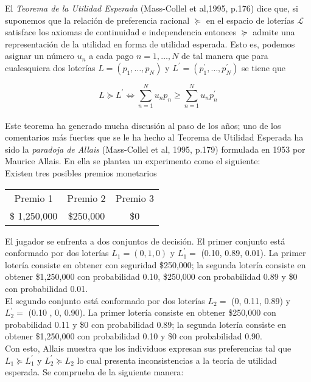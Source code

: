 El \textit{Teorema de la Utilidad Esperada} (Mass-Collel et al,1995, p.176) dice que, si suponemos que la relación de preferencia racional $\succeq$ en el espacio de loterías $\mathscr{L}$ satisface los axiomas de continuidad e independencia entonces $\succeq$ admite una representación de la utilidad en forma de utilidad esperada. Esto es, podemos asignar un número $u_n$ a cada pago $n = 1, \dots, N$ de tal manera que para cualesquiera dos loterías $L = (p_1,\dots,p_N)$ y $L^\prime = (p^{\prime}_1,\dots, p^{\prime}_N)$ se tiene que

$$
L \succeq L^\prime \Leftrightarrow \sum ^{N}_{n = 1} u_n p_n \geq \sum ^{N}_{n = 1} u_n p^{\prime}_n
$$ \\

Este teorema ha generado mucha discusión al paso de los años; uno de los comentarios más fuertes que se le ha hecho al Teorema de Utilidad Esperada ha sido la \textit{paradoja de Allais} (Mass-Collel et al, 1995, p.179) formulada en 1953 por Maurice Allais. En ella se plantea un experimento como el siguiente: \\

Existen tres posibles premios monetarios

\begin{table}[H]
\centering
\begin{tabular}{ccc}
Premio 1     & Premio 2  & Premio 3 \\
\$ 1,250,000 & \$250,000 & \$0     
\end{tabular}
\end{table}

El jugador se enfrenta a dos conjuntos de decisión. El primer conjunto está conformado por dos loterías $L_1 = (0,1,0)$ y $L^{\prime}_1 =$ (0.10, 0.89, 0.01). La primer lotería consiste en obtener con seguridad \$250,000; la segunda lotería consiste en obtener \$1,250,000 con probabilidad 0.10, \$250,000 con probabilidad 0.89 y \$0 con probabilidad 0.01. \\

El segundo conjunto está conformado por dos loterías $L_2 =$ (0, 0.11, 0.89) y $L^{\prime}_2 =$ (0.10 , 0, 0.90). La primer lotería consiste en obtener \$250,000 con probabilidad 0.11 y \$0 con probabilidad 0.89; la segunda lotería consiste en obtener \$1,250,000 con probabilidad 0.10 y \$0 con probabilidad 0.90. \\

Con esto, Allais muestra que los individuos expresan sus preferencias tal que $L_1 \succeq L^{\prime}_1$ y $L^{\prime}_2 \succeq L_2$ lo cual presenta inconsistencias a la teoría de utilidad esperada. Se comprueba de la siguiente manera: \\


